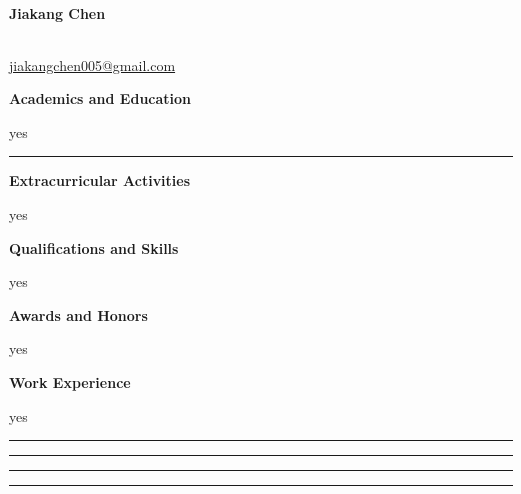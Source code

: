 \documentclass[12pt]{article}
\begin{document}
    \begin{titlepage}
    \end{titlepage}
	
	\hspace*{\fill} \LARGE{\textbf{Jiakang Chen}} \hspace*{\fill}
	
	\vspace{3mm}
	
	\normalsize
	
	\noindent \begin{tabular}{|m{2.29in}|m{2.29in}|m{2.29in}|}
		\hline
		&& \\
		\hline
	\end{tabular}
	
	\url{jiakangchen005@gmail.com}
	
	\bigskip
	
	\bigskip
	
	\large{\textbf{Academics and Education}}
	
	\bigskip
	
	\normalsize
	
	yes
	
	\bigskip
	
	\hspace*{\fill} \rule{256pt}{0.1pt} \hspace*{\fill}
	
	\large{\textbf{Extracurricular Activities}}
	
	\bigskip
	
	\normalsize
	
	yes
	
	\bigskip
	
	\large{\textbf{Qualifications and Skills}}
	
	\bigskip
	
	\normalsize
	
	yes
	
	\bigskip
	
	\large{\textbf{Awards and Honors}}
	
	\bigskip
	
	\normalsize
	
	yes
	
	\bigskip

	\large{\textbf{Work Experience}}
	
	\bigskip
	
	\normalsize

    yes
    
    \bigskip
    
    \rule{0.1pt}{4in} \hspace*{\fill} \rule{0.1pt}{4in} \hspace*{\fill} \rule{0.1pt}{4in} \hspace*{\fill} \rule{0.1pt}{4in}
\end{document}
